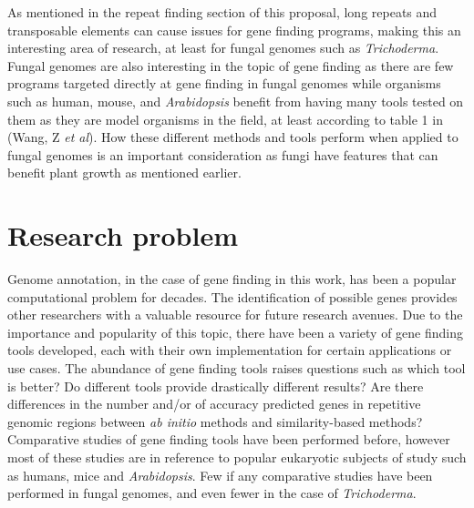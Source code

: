 \documentclass[12pt]{article}
\begin{document}
As mentioned in the repeat finding section of this proposal, long
repeats and transposable elements can cause issues for gene finding
programs, making this an interesting area of research, at least for
fungal genomes such as \textit{Trichoderma}. Fungal genomes are also
interesting in the topic of gene finding as there are few programs
targeted directly at gene finding in fungal genomes while organisms
such as human, mouse, and \textit{Arabidopsis} benefit from having
many tools tested on them as they are model organisms in the field, at
least according to table 1 in (Wang, Z \textit{et
  al})\cite{GeneFinding}. How these different methods and tools
perform when applied to fungal genomes is an important consideration
as fungi have features that can benefit plant growth as mentioned
earlier.


\section{Research problem}
Genome annotation, in the case of gene finding in this work, has been
a popular computational problem for decades. The identification of
possible genes provides other researchers with a valuable resource for
future research avenues. Due to the importance and popularity of this
topic, there have been a variety of gene finding tools developed, each
with their own implementation for certain applications or use
cases. The abundance of gene finding tools raises questions such as
which tool is better? Do different tools provide drastically different
results? Are there differences in the number and/or of accuracy
predicted genes in repetitive genomic regions between \textit{ab
  initio} methods and similarity-based methods?  Comparative studies
of gene finding tools have been performed before, however most of
these studies are in reference to popular eukaryotic subjects of study
such as humans, mice and \textit{Arabidopsis}. Few if any comparative
studies have been performed in fungal genomes, and even fewer in the
case of \textit{Trichoderma}.
\end{document}
